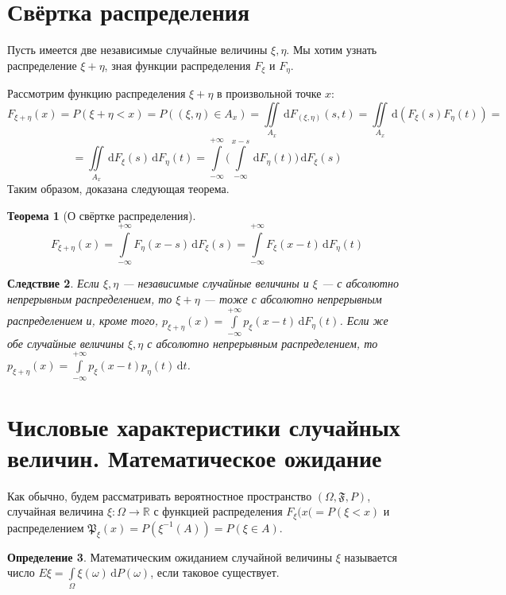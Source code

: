 \documentclass[11pt,openany,a4paper]{scrartcl}
\theoremstyle{plain}
\newtheorem{theorem}{Теорема}[section]
\newtheorem{corollary}[theorem]{Следствие}
\theoremstyle{definition}
\newtheorem{definition}[theorem]{Определение}
\newcommand\mb{\mathbb}
\newcommand\real{\mb R}
\newcommand{\dif}{\, \mathrm d}
\begin{document}
\section{Свёртка распределения}

Пусть имеется две независимые случайные величины $\xi, \eta$. Мы хотим узнать
распределение $\xi + \eta$, зная функции распределения $F_\xi$ и $F_\eta$.

Рассмотрим функцию распределения $\xi + \eta$ в произвольной точке $x$:
$$
F_{\xi + \eta}(x) = P(\xi + \eta < x) = P((\xi, \eta) \in A_x) = 
\iint\limits_{A_x} \dif F_{(\xi, \eta)}(s, t) =
\iint\limits_{A_x} \dif(F_\xi(s)F_\eta(t)) =
$$
$$
= \iint\limits_{A_x} \dif F_\xi(s)\dif F_\eta(t) =
\int\limits_{-\infty}^{+\infty}
\Bigg(\int\limits_{-\infty}^{x-s} \dif F_\eta(t)\Bigg) \dif F_\xi(s)
$$
Таким образом, доказана следующая теорема.
\begin{theorem}[О свёртке распределения]
    $$
    F_{\xi + \eta}(x) = \int\limits_{-\infty}^{+\infty} F_\eta(x-s)
    \dif F_\xi(s) =
    \int\limits_{-\infty}^{+\infty} F_\xi(x-t) \dif F_\eta(t)
    $$
\end{theorem}
\begin{corollary}
    Если $\xi, \eta$ — независимые случайные величины и $\xi$ — с абсолютно
    непрерывным распределением, то $\xi + \eta$ — тоже с абсолютно непрерывным
    распределением и, кроме того, $p_{\xi + \eta}(x) =
    \int\limits_{-\infty}^{+\infty} p_\xi(x - t) \dif F_\eta(t)$. Если же
    обе случайные величины $\xi, \eta$ с абсолютно непрерывным распределением,
    то $p_{\xi + \eta}(x) = \int\limits_{-\infty}^{+\infty}
    p_\xi(x-t)p_\eta(t)\dif t$.
\end{corollary}

\section{Числовые характеристики случайных величин. Математическое ожидание}

Как обычно, будем рассматривать вероятностное пространство
$(\Omega, \mathfrak{F}, P)$, случайная величина $\xi: \Omega \to \real$ с функцией
распределения $F_\xi(x( = P(\xi < x)$ и распределением $\mathfrak P_\xi(x) =
P(\xi^{-1}(A)) = P(\xi \in A)$.

\begin{definition}
    Математическим ожиданием случайной величины $\xi$ называется число
    $E\xi = \int\limits_\Omega \xi(\omega) \dif P(\omega)$, если таковое
    существует.
\end{definition}
\end{document}
